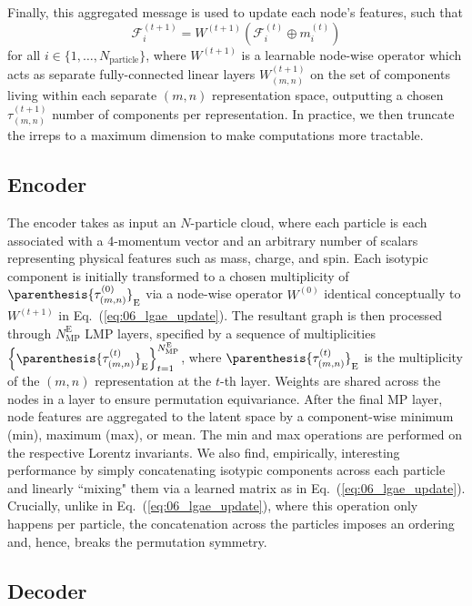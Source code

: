 Finally, this aggregated message is used to update each node's features, such that
\begin{equation} \label{eq:06_lgae_update}
    \mathcal{F}_i^{(t+1)} = W^{(t+1)} \left( \mathcal{F}_i^{(t)} \oplus m_i^{(t)} \right)
\end{equation}
for all $i \in \{1, \ldots, N_{\mathrm{particle}}\}$, where $W^{(t+1)}$ is a learnable node-wise operator which acts as separate fully-connected linear layers $W^{(t+1)}_{(m, n)}$ on the set of components living within each separate $(m, n)$ representation space, outputting a chosen $\tau_{(m,n)}^{(t+1)}$ number of components per representation.
In practice, we then truncate the irreps to a maximum dimension to make computations more tractable.

\subsection{Encoder \label{sec:06_lgae_lgaee}}
The encoder takes as input an $N$-particle cloud, where each particle is each associated with a 4-momentum vector and an arbitrary number of scalars representing physical features such as mass, charge, and spin. 
Each isotypic component is initially transformed to a chosen multiplicity of $\parenthesis{\tau_{(m, n)}^{(0)}}_{\mathrm{E}}$ via a node-wise operator $W^{(0)}$ identical conceptually to $W^{(t+1)}$ in Eq.~(\ref{eq:06_lgae_update}). 
The resultant graph is then processed through $N_{\mathrm{MP}}^{\mathrm{E}}$ LMP layers, specified by a sequence of multiplicities $\left\{ \parenthesis{\tau_{(m, n)}^{(t)}}_{\mathrm{E}} \right\}_{t=1}^{N_{\mathrm{MP}}^{\mathrm{E}}}$, where $\parenthesis{\tau_{(m, n)}^{(t)}}_{\mathrm{E}}$ is the multiplicity of the $(m, n)$ representation at the $t$-th layer. 
Weights are shared across the nodes in a layer to ensure permutation equivariance.
After the final MP layer, node features are aggregated to the latent space by a component-wise minimum (min), maximum (max), or mean. 
The min and max operations are performed on the respective Lorentz invariants.
We also find, empirically, interesting performance by simply concatenating isotypic components across each particle and linearly ``mixing" them via a learned matrix as in Eq.~(\ref{eq:06_lgae_update}). 
Crucially, unlike in Eq.~(\ref{eq:06_lgae_update}), where this operation only happens per particle, the concatenation across the particles imposes an ordering and, hence, breaks the permutation symmetry. 


\subsection{Decoder \label{sec:06_lgae_lgaed}}

